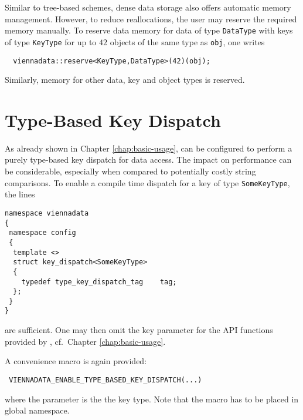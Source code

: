 Similar to tree-based schemes, dense data storage also offers automatic memory management. However, to reduce reallocations,
the user may reserve the required memory manually.
To reserve data memory for data of type \lstinline|DataType| with keys of type \lstinline|KeyType| for up to $42$ objects of the same type as \lstinline|obj|,
one writes
\begin{lstlisting}
  viennadata::reserve<KeyType,DataType>(42)(obj);
\end{lstlisting}
Similarly, memory for other data, key and object types is reserved.


\section{Type-Based Key Dispatch} \label{sec:compiletime-keys}
As already shown in Chapter \ref{chap:basic-usage}, {\ViennaData} can be configured to perform a purely type-based key dispatch for data access.
The impact on performance can be considerable, especially when compared to potentially costly string comparisons.
To enable a compile time dispatch for a key of type \lstinline|SomeKeyType|, the lines
\begin{lstlisting}
namespace viennadata
{
 namespace config
 {
  template <>
  struct key_dispatch<SomeKeyType>
  {
    typedef type_key_dispatch_tag    tag;
  };
 }
} 
\end{lstlisting}
are sufficient. One may then omit the key parameter for the API functions provided by {\ViennaData}, cf.~Chapter \ref{chap:basic-usage}.

A convenience macro is again provided:
\begin{lstlisting}
 VIENNADATA_ENABLE_TYPE_BASED_KEY_DISPATCH(...)
\end{lstlisting}
where the parameter is the the key type. Note that the macro has to be placed in global namespace.



